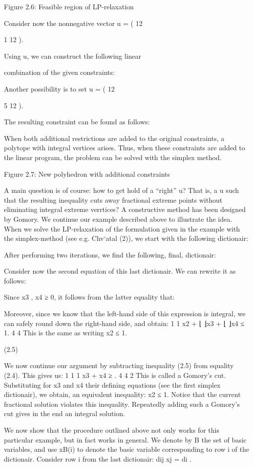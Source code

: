\documentclass[titlepage]{book}
\theoremstyle{plain}
\theoremstyle{definition}
\theoremstyle{remark}
\begin{document}
Figure 2.6: Feasible region of LP-relaxation

Consider now the nonnegative vector u = ( 12

1
12 ).

Using u, we can construct the following linear

combination of the given constraints:

Another possibility is to set u = ( 12

5
12 ).

The resulting constraint can be found as follows:


When both additional restrictions are added to the original constraints, a polytope with integral vertices
arises. Thus, when these constraints are added to the linear program, the problem can be solved with
the simplex method.

Figure 2.7: New polyhedron with additional constraints

A main question is of course: how to get hold of a “right” u? That is, a u such that the resulting inequality cuts away fractional extreme points without eliminating integral extreme verrtices? A constructive
method has been designed by Gomory. We continue our example described above to illustrate the idea.
When we solve the LP-relaxation of the formulation given in the example with the simplex-method (see
e.g. Chv`atal (2)), we start with the following dictionair:

After performing two iterations, we find the following, final, dictionair:

Consider now the second equation of this last dictionair. We can rewrite it as follows:

Since x3 , x4 ≥ 0, it follows from the latter equality that:

Moreover, since we know that the left-hand side of this expression is integral, we can safely round down
the right-hand side, and obtain:
1
1
x2 + ⌊ ⌋x3 + ⌊ ⌋x4 ≤ 1.
4
4
This is the same as writing
x2 ≤ 1.

(2.5)

We now continue our argument by subtracting inequality (2.5) from equality (2.4). This gives us:
1
1
1
x3 + x4 ≥ .
4
4
2
This is called a Gomory's cut. Substituting for x3 and x4 their defining equations (see the first simplex
dictionair), we obtain, an equivalent inequality:
x2 ≤ 1.
Notice that the current fractional solution violates this inequality. Repeatedly adding such a Gomory's
cut gives in the end an integral solution.

We now show that the procedure outlined above not only works for this particular example, but in fact
works in general. We denote by B the set of basic variables, and use xB(i) to denote the basic variable
corresponding to row i of the dictionair. Consider row i from the last dictionair:
dij xj = di .
\end{document}
